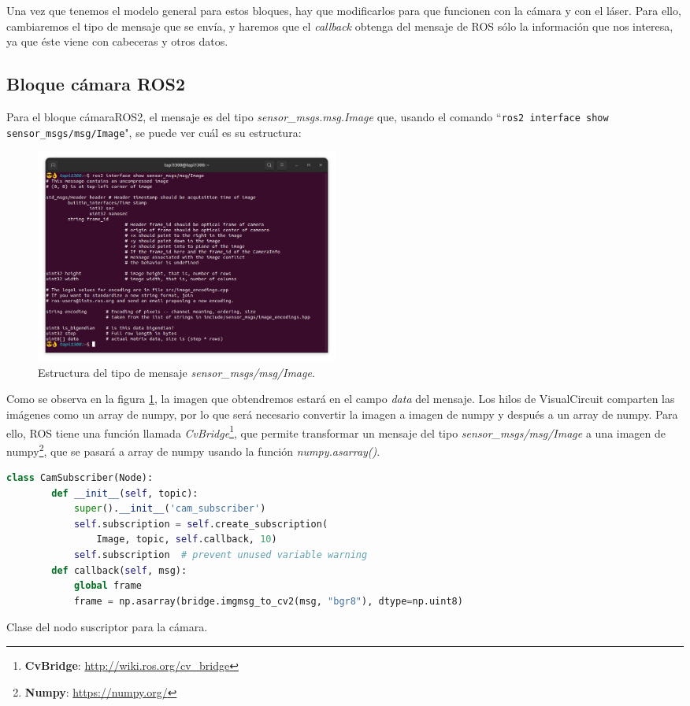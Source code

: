 Una vez que tenemos el modelo general para estos bloques, hay que modificarlos para que funcionen con la cámara y con el láser. Para ello,
cambiaremos el tipo de mensaje que se envía, y haremos que el \textit{callback} obtenga del mensaje de ROS sólo la información que nos interesa,
ya que éste viene con cabeceras y otros datos.\\
\newpage
\subsection{Bloque cámara ROS2}
\label{subsec:cameraROS2}

Para el bloque cámaraROS2, el mensaje es del tipo \textit{sensor\_msgs.msg.Image} que,
usando el comando ``\lstinline|ros2 interface show sensor_msgs/msg/Image|", se puede ver cuál es su estructura:
\begin{figure} [H]
  \begin{center}
      \includegraphics[width=10cm]{figs/c4/image_struct.png}
  \end{center}
  \caption[Estructura mensaje Image]{Estructura del tipo de mensaje \textit{sensor\_msgs/msg/Image}.}
  \label{fig:image_struct}
\end{figure}
Como se observa en la figura \ref{fig:image_struct}, la imagen que obtendremos estará en el campo \textit{data} del mensaje. Los hilos de VisualCircuit
comparten las imágenes como un array de numpy, por lo que será necesario convertir la imagen a imagen de numpy y después a un array de numpy.
Para ello, ROS tiene una función llamada \textit{CvBridge}\footnote{\textbf{CvBridge}: \url{http://wiki.ros.org/cv_bridge}}, que permite transformar un mensaje del
tipo \textit{sensor\_msgs/msg/Image} a una imagen de numpy\footnote{\textbf{Numpy}: \url{https://numpy.org/}}, que se pasará a array de numpy usando la
función \textit{numpy.asarray()}.
\begin{code}[H]
  \begin{lstlisting}[language=python]
    class CamSubscriber(Node):
        def __init__(self, topic):
            super().__init__('cam_subscriber')
            self.subscription = self.create_subscription(
                Image, topic, self.callback, 10)
            self.subscription  # prevent unused variable warning
        def callback(self, msg):
            global frame
            frame = np.asarray(bridge.imgmsg_to_cv2(msg, "bgr8"), dtype=np.uint8)
  \end{lstlisting}
  \caption[Clase del nodo suscriptor para cámara]{Clase del nodo suscriptor para la cámara.}
  \label{cod:cam_node_class}
\end{code}
